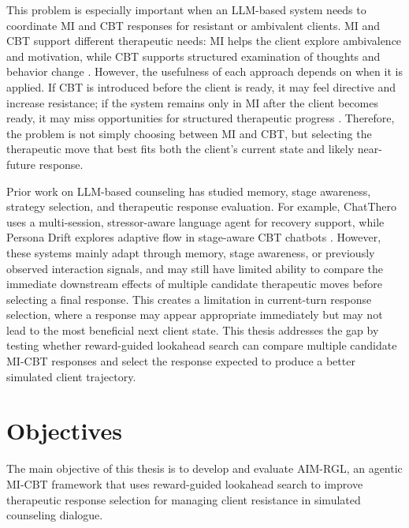 This problem is especially important when an LLM-based system needs to coordinate MI and CBT responses for resistant or ambivalent clients. MI and CBT support different therapeutic needs: MI helps the client explore ambivalence and motivation, while CBT supports structured examination of thoughts and behavior change \cite{miller2013motivational,bischof2021motivational,beck2020cognitive,chand2023cognitive}. However, the usefulness of each approach depends on when it is applied. If CBT is introduced before the client is ready, it may feel directive and increase resistance; if the system remains only in MI after the client becomes ready, it may miss opportunities for structured therapeutic progress \cite{prochaska1997transtheoretical,raihan2023stages}. Therefore, the problem is not simply choosing between MI and CBT, but selecting the therapeutic move that best fits both the client's current state and likely near-future response.

Prior work on LLM-based counseling has studied memory, stage awareness, strategy selection, and therapeutic response evaluation. For example, ChatThero uses a multi-session, stressor-aware language agent for recovery support, while Persona Drift explores adaptive flow in stage-aware CBT chatbots \cite{wang2025chatthero,yun2025personadrift}. However, these systems mainly adapt through memory, stage awareness, or previously observed interaction signals, and may still have limited ability to compare the immediate downstream effects of multiple candidate therapeutic moves before selecting a final response. This creates a limitation in current-turn response selection, where a response may appear appropriate immediately but may not lead to the most beneficial next client state. This thesis addresses the gap by testing whether reward-guided lookahead search can compare multiple candidate MI-CBT responses and select the response expected to produce a better simulated client trajectory.

\section{Objectives}

The main objective of this thesis is to develop and evaluate AIM-RGL, an agentic MI-CBT framework that uses reward-guided lookahead search to improve therapeutic response selection for managing client resistance in simulated counseling dialogue.

